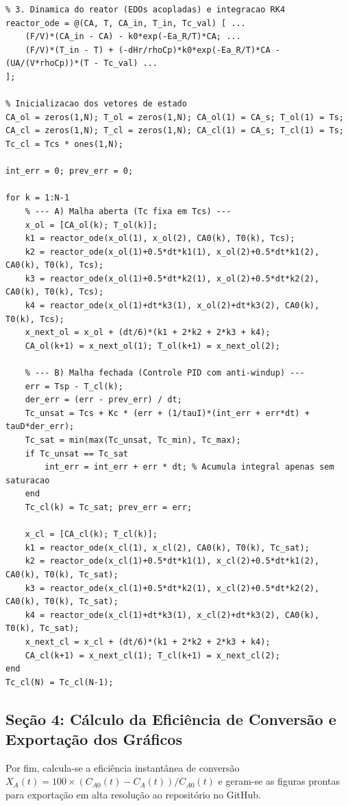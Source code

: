 \documentclass[11pt, a4paper]{article}
\begin{document}
\begin{lstlisting}
% 3. Dinamica do reator (EDOs acopladas) e integracao RK4
reactor_ode = @(CA, T, CA_in, T_in, Tc_val) [ ...
    (F/V)*(CA_in - CA) - k0*exp(-Ea_R/T)*CA; ...
    (F/V)*(T_in - T) + (-dHr/rhoCp)*k0*exp(-Ea_R/T)*CA - (UA/(V*rhoCp))*(T - Tc_val) ...
];

% Inicializacao dos vetores de estado
CA_ol = zeros(1,N); T_ol = zeros(1,N); CA_ol(1) = CA_s; T_ol(1) = Ts;
CA_cl = zeros(1,N); T_cl = zeros(1,N); CA_cl(1) = CA_s; T_cl(1) = Ts;
Tc_cl = Tcs * ones(1,N);

int_err = 0; prev_err = 0;

for k = 1:N-1
    % --- A) Malha aberta (Tc fixa em Tcs) ---
    x_ol = [CA_ol(k); T_ol(k)];
    k1 = reactor_ode(x_ol(1), x_ol(2), CA0(k), T0(k), Tcs);
    k2 = reactor_ode(x_ol(1)+0.5*dt*k1(1), x_ol(2)+0.5*dt*k1(2), CA0(k), T0(k), Tcs);
    k3 = reactor_ode(x_ol(1)+0.5*dt*k2(1), x_ol(2)+0.5*dt*k2(2), CA0(k), T0(k), Tcs);
    k4 = reactor_ode(x_ol(1)+dt*k3(1), x_ol(2)+dt*k3(2), CA0(k), T0(k), Tcs);
    x_next_ol = x_ol + (dt/6)*(k1 + 2*k2 + 2*k3 + k4);
    CA_ol(k+1) = x_next_ol(1); T_ol(k+1) = x_next_ol(2);

    % --- B) Malha fechada (Controle PID com anti-windup) ---
    err = Tsp - T_cl(k);
    der_err = (err - prev_err) / dt;
    Tc_unsat = Tcs + Kc * (err + (1/tauI)*(int_err + err*dt) + tauD*der_err);
    Tc_sat = min(max(Tc_unsat, Tc_min), Tc_max);
    if Tc_unsat == Tc_sat
        int_err = int_err + err * dt; % Acumula integral apenas sem saturacao
    end
    Tc_cl(k) = Tc_sat; prev_err = err;

    x_cl = [CA_cl(k); T_cl(k)];
    k1 = reactor_ode(x_cl(1), x_cl(2), CA0(k), T0(k), Tc_sat);
    k2 = reactor_ode(x_cl(1)+0.5*dt*k1(1), x_cl(2)+0.5*dt*k1(2), CA0(k), T0(k), Tc_sat);
    k3 = reactor_ode(x_cl(1)+0.5*dt*k2(1), x_cl(2)+0.5*dt*k2(2), CA0(k), T0(k), Tc_sat);
    k4 = reactor_ode(x_cl(1)+dt*k3(1), x_cl(2)+dt*k3(2), CA0(k), T0(k), Tc_sat);
    x_next_cl = x_cl + (dt/6)*(k1 + 2*k2 + 2*k3 + k4);
    CA_cl(k+1) = x_next_cl(1); T_cl(k+1) = x_next_cl(2);
end
Tc_cl(N) = Tc_cl(N-1);
\end{lstlisting}

\subsection{Seção 4: Cálculo da Eficiência de Conversão e Exportação dos Gráficos}
Por fim, calcula-se a eficiência instantânea de conversão $X_A(t) = 100 \times (C_{A0}(t) - C_A(t))/C_{A0}(t)$ e geram-se as figuras prontas para exportação em alta resolução ao repositório no GitHub.
\end{document}
